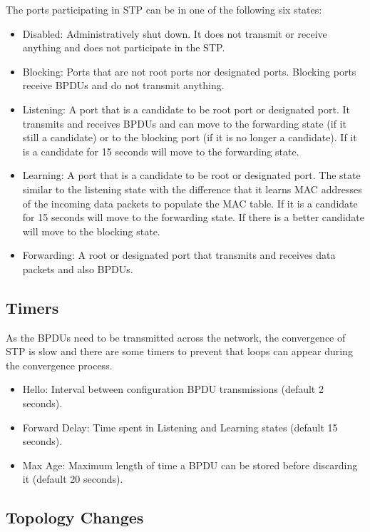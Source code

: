 The ports participating in STP can be in one of the following six states:
\begin{itemize}
\item Disabled: Administratively shut down. It does not transmit or receive anything and does not participate in the STP.
\item Blocking: Ports that are not root ports nor designated ports.
Blocking ports receive BPDUs and do not transmit anything.
\item Listening: A port that is a candidate to be root port or designated port.
It transmits and receives BPDUs and can move to the forwarding state (if it still a candidate) or to the blocking port (if it is no longer a candidate).
If it is a candidate for 15 seconds will move to the forwarding state.
\item Learning: A port that is a candidate to be root or designated port.
The state similar to the listening state with the difference that it learns MAC addresses of the incoming data packets to populate the MAC table.
If it is a candidate for 15 seconds will move to the forwarding state.
If there is a better candidate will move to the blocking state.
\item Forwarding: A root or designated port that transmits and receives data packets and also BPDUs.
\end{itemize}

\subsection{Timers}

As the BPDUs need to be transmitted across the network, the convergence of STP is slow and there are some timers to prevent that loops can appear during the convergence process.

\begin{itemize}
\item Hello: Interval between configuration BPDU transmissions (default 2 seconds).
\item Forward Delay: Time spent in Listening and Learning states (default 15 seconds).
\item Max Age: Maximum length of time a BPDU can be stored before discarding it (default 20 seconds).
\end{itemize}

\subsection{Topology Changes}

